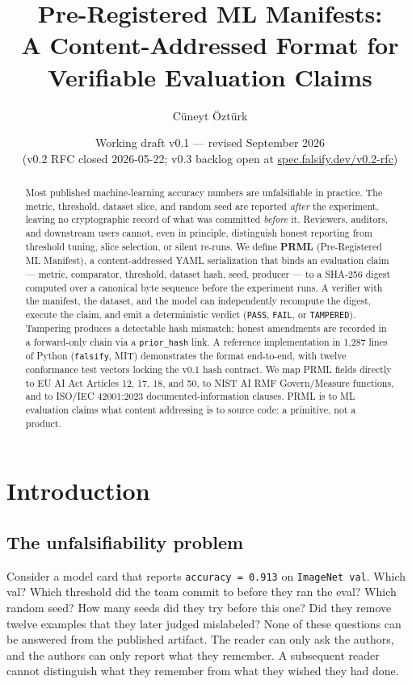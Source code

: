 \documentclass[11pt, a4paper]{article}
\title{\bfseries Pre-Registered ML Manifests:\\
A Content-Addressed Format for Verifiable Evaluation Claims}
\author[1]{C\"uneyt \"Ozt\"urk}
\affil[1]{Falsify O\"U, Tallinn. Correspondence: \href{mailto:hello@falsify.dev}{hello@falsify.dev}\\
Spec: \href{https://spec.falsify.dev/v0.1}{spec.falsify.dev/v0.1} \quad
Code: \href{https://github.com/falsify-dev/falsify}{github.com/falsify-dev/falsify} \quad
DOI: \href{https://doi.org/10.5281/zenodo.20177839}{10.5281/zenodo.20177839}}
\date{Working draft v0.1 --- revised September 2026\\ {\small (v0.2 RFC closed 2026-05-22; v0.3 backlog open at \href{https://spec.falsify.dev/v0.2-rfc}{spec.falsify.dev/v0.2-rfc})}}
\begin{document}
\maketitle

\begin{abstract}
\noindent
Most published machine-learning accuracy numbers are unfalsifiable in practice. The metric, threshold, dataset slice, and random seed are reported \emph{after} the experiment, leaving no cryptographic record of what was committed \emph{before} it. Reviewers, auditors, and downstream users cannot, even in principle, distinguish honest reporting from threshold tuning, slice selection, or silent re-runs. We define \textbf{PRML} (Pre-Registered ML Manifest), a content-addressed YAML serialization that binds an evaluation claim --- metric, comparator, threshold, dataset hash, seed, producer --- to a SHA-256 digest computed over a canonical byte sequence before the experiment runs. A verifier with the manifest, the dataset, and the model can independently recompute the digest, execute the claim, and emit a deterministic verdict (\texttt{PASS}, \texttt{FAIL}, or \texttt{TAMPERED}). Tampering produces a detectable hash mismatch; honest amendments are recorded in a forward-only chain via a \texttt{prior\_hash} link. A reference implementation in 1{,}287 lines of Python (\texttt{falsify}, MIT) demonstrates the format end-to-end, with twelve conformance test vectors locking the v0.1 hash contract. We map PRML fields directly to EU AI Act Articles 12, 17, 18, and 50, to NIST AI RMF Govern/Measure functions, and to ISO/IEC 42001:2023 documented-information clauses. PRML is to ML evaluation claims what content addressing is to source code: a primitive, not a product.
\end{abstract}

\section{Introduction}
\label{sec:intro}

\subsection{The unfalsifiability problem}

Consider a model card that reports \texttt{accuracy = 0.913} on \texttt{ImageNet val}. Which val? Which threshold did the team commit to before they ran the eval? Which random seed? How many seeds did they try before this one? Did they remove twelve examples that they later judged mislabeled? None of these questions can be answered from the published artifact. The reader can only ask the authors, and the authors can only report what they remember. A subsequent reader cannot distinguish what they remember from what they wished they had done.
\end{document}
